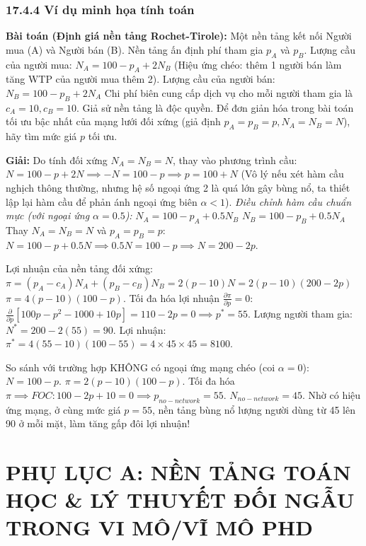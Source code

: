 \documentclass[
]{article}
\begin{document}
\subsubsection{17.4.4 Ví dụ minh họa tính
toán}\label{vuxed-dux1ee5-minh-hux1ecda-tuxednh-touxe1n-3}

\textbf{Bài toán (Định giá nền tảng Rochet-Tirole):} Một nền tảng kết
nối Người mua (A) và Người bán (B). Nền tảng ấn định phí tham gia
\(p_A\) và \(p_B\). Lượng cầu của người mua: \(N_A = 100 - p_A + 2N_B\)
(Hiệu ứng chéo: thêm 1 người bán làm tăng WTP của người mua thêm 2).
Lượng cầu của người bán: \(N_B = 100 - p_B + 2N_A\) Chi phí biên cung
cấp dịch vụ cho mỗi người tham gia là \(c_A = 10, c_B = 10\). Giả sử nền
tảng là độc quyền. Để đơn giản hóa trong bài toán tối ưu bậc nhất của
mạng lưới đối xứng (giả định \(p_A = p_B = p, N_A = N_B = N\)), hãy tìm
mức giá \(p\) tối ưu.

\textbf{Giải:} Do tính đối xứng \(N_A = N_B = N\), thay vào phương trình
cầu: \(N = 100 - p + 2N \implies -N = 100 - p \implies p = 100 + N\) (Vô
lý nếu xét hàm cầu nghịch thông thường, nhưng hệ số ngoại ứng 2 là quá
lớn gây bùng nổ, ta thiết lập lại hàm cầu để phản ánh ngoại ứng biên
\(\alpha < 1\)). \emph{Điều chỉnh hàm cầu chuẩn mực (với ngoại ứng
\(\alpha = 0.5\)):} \(N_A = 100 - p_A + 0.5 N_B\)
\(N_B = 100 - p_B + 0.5 N_A\) Thay \(N_A = N_B = N\) và
\(p_A = p_B = p\):
\(N = 100 - p + 0.5N \implies 0.5N = 100 - p \implies N = 200 - 2p\).

Lợi nhuận của nền tảng đối xứng:
\(\pi = (p_A - c_A)N_A + (p_B - c_B)N_B = 2(p - 10)N = 2(p - 10)(200 - 2p)\)
\(\pi = 4(p - 10)(100 - p)\). Tối đa hóa lợi nhuận
\(\frac{\partial \pi}{\partial p} = 0\):
\(\frac{\partial}{\partial p} [100p - p^2 - 1000 + 10p] = 110 - 2p = 0 \implies p^* = 55\).
Lượng người tham gia: \(N^* = 200 - 2(55) = 90\). Lợi nhuận:
\(\pi^* = 4(55 - 10)(100 - 55) = 4 \times 45 \times 45 = 8100\).

So sánh với trường hợp KHÔNG có ngoại ứng mạng chéo (coi
\(\alpha = 0\)): \(N = 100 - p\). \(\pi = 2(p - 10)(100 - p)\). Tối đa
hóa
\(\pi \implies FOC: 100 - 2p + 10 = 0 \implies p_{no-network} = 55\).
\(N_{no-network} = 45\). Nhờ có hiệu ứng mạng, ở cùng mức giá \(p=55\),
nền tảng bùng nổ lượng người dùng từ 45 lên 90 ở mỗi mặt, làm tăng gấp
đôi lợi nhuận!

\section{PHỤ LỤC A: NỀN TẢNG TOÁN HỌC \& LÝ THUYẾT ĐỐI NGẪU TRONG VI
MÔ/VĨ MÔ
PHD}\label{phux1ee5-lux1ee5c-a-nux1ec1n-tux1ea3ng-touxe1n-hux1ecdc-luxfd-thuyux1ebft-ux111ux1ed1i-ngux1eabu-trong-vi-muxf4vux129-muxf4-phd}
\end{document}
